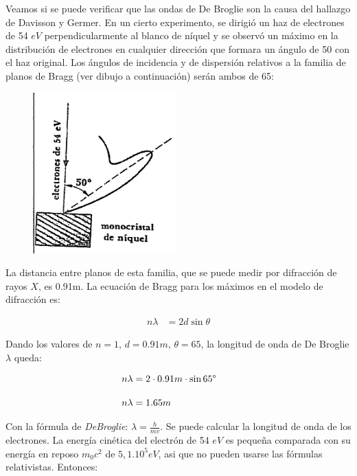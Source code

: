 \documentclass[a4paper]{article}
\begin{document}
    \indent Veamos si se puede verificar que las ondas de De Broglie son la causa del hallazgo de Davisson y Germer. En un cierto experimento, se dirigió un haz de electrones de 54 $eV$ perpendicularmente al blanco de níquel y se observó un máximo en la distribución de electrones en cualquier dirección que formara un ángulo de {50\textdegree} con el haz original. Los ángulos de incidencia y de dispersión relativos a la familia de planos de Bragg (ver dibujo a continuación) serán ambos de {65\textdegree}:

    \begin{figure}[h!]
        \centering
        \includegraphics[width = 5.5cm]{../figura3-7.png}
    \end{figure}

    \newpage
    \noindent
    \thispagestyle{fancy}

    \indent La distancia entre planos de esta familia, que se puede medir por difracción de rayos $X$, es 0.91m. La ecuación de Bragg para los máximos en el modelo de difracción es: 


    \begin{align}
        n\lambda &= 2d \sin \theta \tag*{}
    \end{align}

\indent Dando los valores de $n=1$, $d=0.91m$, {$\theta=65$\textdegree}, la longitud de onda de De Broglie $\lambda$ queda:

    \begin{align}
        n\lambda &= 2 \cdot 0.91m  \cdot \sin {65\text{\textdegree}} \tag*{} \\[10pt]
        n\lambda &= 1.65m \tag*{}
    \end{align}

    \indent Con la fórmula de \textit{DeBroglie}: $\lambda=\frac{h}{mv}$. Se puede calcular la longitud de onda de los electrones. La energía cinética del electrón de 54 $eV$ es pequeña comparada con su energía en reposo $m_0c^2$ de $5,1 . 10^5 eV$, asi que no pueden usarse las fórmulas relativistas. Entonces:
\end{document}
